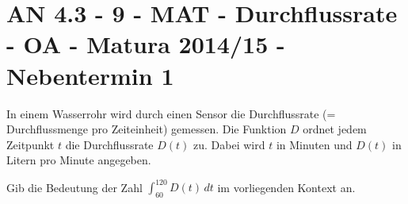 \section{AN 4.3 - 9 - MAT - Durchflussrate - OA - Matura 2014/15 - Nebentermin 1}

\begin{beispiel}[AN 4.3]{1} %
In einem Wasserrohr wird durch einen Sensor die Durchflussrate (= Durchflussmenge pro Zeiteinheit) gemessen. Die Funktion $D$ ordnet jedem Zeitpunkt $t$ die Durchflussrate $D(t)$ zu. Dabei wird $t$ in Minuten und $D(t)$ in Litern pro Minute angegeben. \leer

Gib die Bedeutung der Zahl $\displaystyle\int_{60}^{120}{D(t)\,dt}$ im vorliegenden Kontext an.

\end{beispiel}